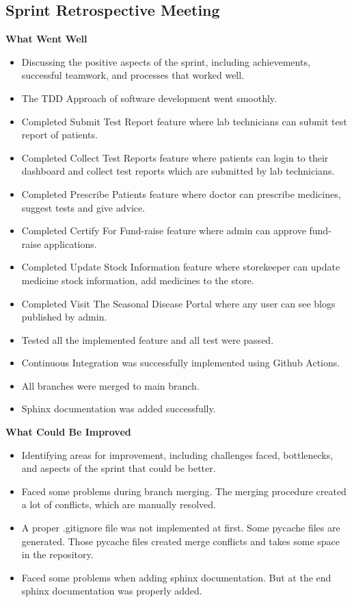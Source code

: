 \documentclass[a4paper,12pt]{article}
\begin{document}
\subsection{Sprint Retrospective Meeting}
\textbf{What Went Well}
\begin{itemize}
    \item Discussing the positive aspects of the sprint, including achievements, successful teamwork, and processes that worked well.

    \item The TDD Approach of software development went smoothly.
    \item Completed Submit Test Report feature where lab technicians can submit test report of patients.
    \item Completed Collect Test Reports feature where patients can login to their dashboard and collect test reports which are submitted by lab technicians.
    \item Completed Prescribe Patients feature where doctor can prescribe medicines, suggest tests and give advice.
    \item Completed Certify For Fund-raise feature where admin can approve fund-raise applications.
    \item Completed Update Stock Information feature where storekeeper can update medicine stock information, add medicines to the store.
    \item Completed Visit The Seasonal Disease Portal where any user can see blogs published by admin.
    \item Tested all the implemented feature and all test were passed.
    \item Continuous Integration was successfully implemented using Github Actions.
    \item All branches were merged to main branch.
    \item Sphinx documentation was added successfully.
\end{itemize}
\textbf{What Could Be Improved}
\begin{itemize}
    \item Identifying areas for improvement, including challenges faced, bottlenecks, and aspects of the sprint that could be better.

    \item Faced some problems during branch merging. The merging procedure created a lot of conflicts, which are manually resolved.
    \item A proper .gitignore file was not implemented at first. Some pycache files are generated. Those pycache files created merge conflicts and takes some space in the repository.
    \item Faced some problems when adding sphinx documentation. But at the end sphinx documentation was properly added.
\end{itemize}
\end{document}
